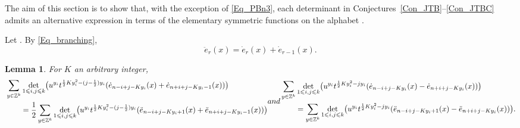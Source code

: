 \documentclass[pdftex]{sigma}
\numberwithin{equation}{section}
\newtheorem{Lemma}[Theorem]{Lemma}
\renewcommand{\leq}{\leqslant}
\begin{document}
The aim of this section is to show that, with the exception of
\eqref{Eq_PBn3}, each determinant in
Conjectures~\ref{Con_JTB}--\ref{Con_JTBC} admits an alternative
expression in terms of the elementary symmetric functions on the
alphabet .

Let .
By \eqref{Eq_branching},
\begin{equation}\label{Eq_ee}
\ddot{e}_r(x)=\dot{e}_r(x)+\dot{e}_{r-1}(x).
\end{equation}

\begin{Lemma}\label{Lem_determinant}
For $K$ an arbitrary integer,
\begin{subequations}
\begin{align}
\begin{aligned}[b]
&\sum_{y\in\mathbb{Z}^k}
\det_{1\leq i,j\leq k}\bigl(u^{y_i}
t^{\frac{1}{2}Ky_i^2-(j-\frac{1}{2})y_i}
 (\dot{e}_{n-i+j-Ky_i}(x)+\dot{e}_{n+i+j-Ky_i-1}(x) )\bigr)
  \\
&\qquad{}=\frac{1}{2}\sum_{y\in\mathbb{Z}^k}
\det_{1\leq i,j\leq k}\bigl(u^{y_i}
t^{\frac{1}{2}Ky_i^2-(j-\frac{1}{2})y_i}
 (\ddot{e}_{n-i+j-Ky_i+1}(x)+\ddot{e}_{n+i+j-Ky_i-1}(x) )\bigr)
 \end{aligned}
\label{Eq_doteddote}
\end{align}
and
\begin{align}
&\sum_{y\in\mathbb{Z}^k}
\det_{1\leq i,j\leq k}\bigl(u^{y_i}
t^{\frac{1}{2}Ky_i^2-j y_i} (
\dot{e}_{n-i+j-Ky_i}(x)-\dot{e}_{n+i+j-Ky_i}(x) )\bigr) \notag \\
&\qquad{}=
\sum_{y\in\mathbb{Z}^k}
\det_{1\leq i,j\leq k}\bigl(u^{y_i}
t^{\frac{1}{2}Ky_i^2-j y_i} (
\ddot{e}_{n-i+j-Ky_i+1}(x)-\ddot{e}_{n+i+j-Ky_i}(x) )\bigr).
\label{Eq_doteddote2}
\end{align}
\end{subequations}
\end{Lemma}
\end{document}
